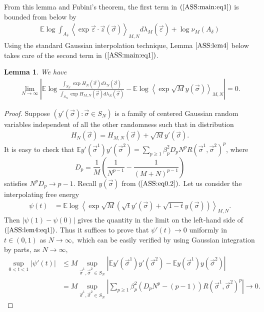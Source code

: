 \documentclass[12pt]{article}
\newcommand{\veps}{\vec{\varepsilon}}
\newcommand{\vsi}{{\vec{\sigma}}}
\newcommand{\vz}{\vec{z}}
\newtheorem{lemma}{\bf Lemma}
\newenvironment{Proof of lemma}{\noindent{\bf Proof of Lemma}}{\hfill$\Box$\newline}
\newenvironment{Proof of theorem}{\noindent{\bf Proof of Theorem}}{\hfill{\footnotesize${\square}$}\newline}
\newenvironment{Proof of theorems}{\noindent{\bf Proof of Theorems}}{\hfill$\Box$\newline}
\newenvironment{Proof of proposition}{\noindent{\bf Proof of Proposition}}{\hfill$\Box$\newline}
\newenvironment{Proof of propositions}{\noindent{\bf Proof of Propositions}}{\hfill$\Box$\newline}
\newenvironment{Proof of exercise}{\noindent{\it Proof of Exercise:}}{\hfill$\Box$}
\numberwithin{equation}{section}
\begin{document}
\noindent From this lemma and Fubini's theorem, the first term in $(\ref{ASS:main:eq1})$ is bounded from below by 
\begin{align}
\label{ASS:lem5.1:eq1}
\mathbb{E}\log\int_{A_\delta}\left<\exp \veps\cdot\vz(\vsi)\right>_{M,N}d\lambda_M(\veps)+\log \nu_M(A_\delta)
\end{align}
Using the standard Gaussian interpolation technique, Lemma $\ref{ASS:lem4}$ below takes care of the second term in $(\ref{ASS:main:eq1})$.

\begin{lemma}
\label{ASS:lem4}
We have
\begin{align}
\label{ASS:lem4:eq1}
\lim_{N\rightarrow\infty}\left|\mathbb{E}\log\frac{ \int_{S_N}\exp H_{N}(\vsi)d\lambda_N(\vsi)}{\int_{S_N}\exp H_{M,N}(\vsi)d\lambda_N(\vsi)}
-\mathbb{E}\log \left<\exp\sqrt{M}y(\vsi)\right>_{M,N}\right|=0.
\end{align}
\end{lemma}

\begin{proof}
Suppose $(y'(\vsi):\vsi\in S_N)$ is a family of centered Gaussian random variables independent of all the other randomness such that in distribution
\begin{align*}
H_N(\vsi)=H_{M,N}(\vsi)+\sqrt{M}y'(\vsi).
\end{align*}
It is easy to check that 
$\mathbb{E}y'(\vsi^1)y'(\vsi^2)=\sum_{p\geq 1}\beta_p^2D_pN^pR(\vsi^1,\vsi^2)^{p}$, where $$
D_{p}=\frac{1}{M}\left(\frac{1}{N^{p-1}}-\frac{1}{(M+N)^{p-1}}\right)
$$ 
satisfies $N^pD_{p}\rightarrow p-1.$ Recall $y(\vsi)$ from $(\ref{ASS:eq0.2}).$ Let us consider the interpolating free energy
\begin{align*}
\psi(t)&=\mathbb{E}\log \left<\exp \sqrt{M}\left(\sqrt{t}y'(\vsi)+\sqrt{1-t}{y}(\vsi)\right)\right>_{M,N}.
\end{align*}
Then $|\psi(1)-\psi(0)|$ gives the quantity in the limit on the left-hand side of $(\ref{ASS:lem4:eq1})$. Thus it suffices to prove that $\psi'(t)\rightarrow 0$ uniformly in $t\in (0,1)$ as $N\rightarrow\infty,$ which can be easily verified by using Gaussian integration by parts, as $N\rightarrow\infty,$
\begin{align*}
\sup_{0<t<1}|\psi'(t)|&\leq M\sup_{\vsi^1,\vsi^2\in S_N}|\mathbb{E}y'(\vsi^1)y'(\vsi^2)-\mathbb{E}y(\vsi^1)y(\vsi^2)|\\
&=M\sup_{\vsi^1,\vsi^2\in S_N}\left|\sum_{p\geq 1}\beta_p^2(D_{p}N^p-(p-1))R(\vsi^1,\vsi^2)^p\right|\rightarrow 0.
\end{align*}
\end{proof}
\end{document}
